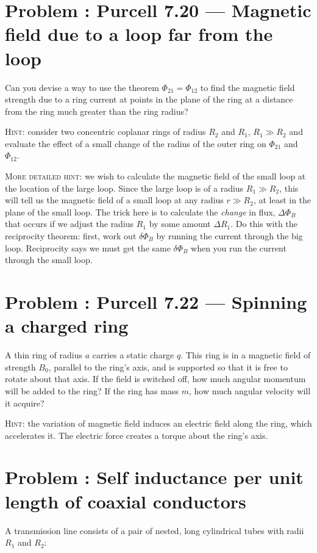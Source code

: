 \documentclass[problems]{esg8022pset}
\begin{document}
\section{Problem \thesection: Purcell 7.20 --- Magnetic field due to a loop far from the loop}
  Can you devise a way to use the theorem $\Phi_{21}=\Phi_{12}$ to find the magnetic
  field strength due to a ring current at points in the plane of the ring at a distance from the ring much greater than the ring radius?

  \noindent \textsc{Hint}: consider two concentric coplanar rings of radius $R_{2}$ and $R_{1}$, $R_{1}\gg R_{2}$ and evaluate the effect of a small change
  of the radius of the outer ring on $\Phi_{21}$ and $\Phi_{12}$.

  \noindent \textsc{More detailed hint}:  we wish to calculate
  the magnetic field of the small loop at the location of the large
  loop.  Since the large loop is of a radius $R_1 \gg R_2$, this will
  tell us the magnetic field of a small loop at any radius $r \gg R_2$,
  at least in the plane of the small loop. The trick here is to calculate the {\it change} in
  flux, $\Delta\Phi_B$ that occurs if we adjust the radius $R_1$ by
  some amount $\Delta R_1$.  Do this with the reciprocity theorem:
  first, work out $\delta\Phi_B$ by running the current through the big
  loop.  Reciprocity says we must get the same
  $\delta\Phi_B$ when you run the current through the small loop.
\section{Problem \thesection: Purcell 7.22 --- Spinning a charged ring}
  A thin ring of radius $a$ carries a static charge $q$. This ring is in a magnetic field of strength $B_0$, parallel to the ring's axis, and is supported so that it is free to rotate about that axis. If the field is switched off, how much angular momentum will be added to the ring? If the ring has mass $m$, how much angular velocity will it acquire?

  \noindent \textsc{Hint}: the variation of magnetic field induces an
  electric field along the ring, which accelerates it. The electric force creates a torque about the ring's axis.
\section{Problem \thesection: Self inductance per unit length of coaxial conductors }
  A transmission line consists of a pair of nested, long cylindrical
  tubes with radii $R_1$ and $R_2$:
\end{document}

